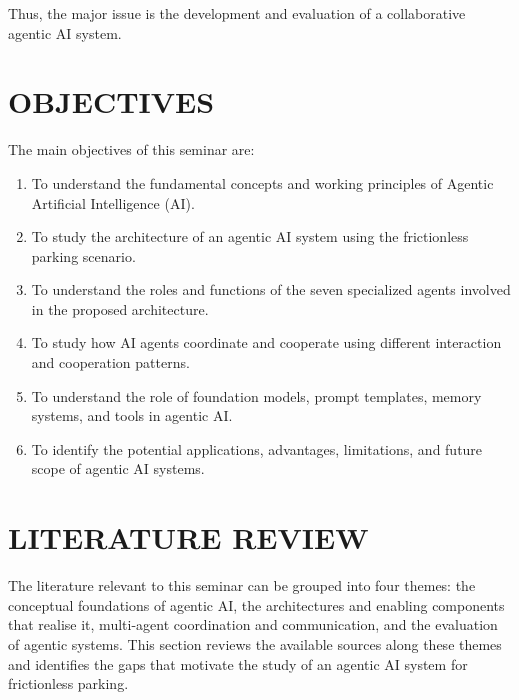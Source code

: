 \documentclass[12pt,a4paper]{report}
\begin{document}
Thus, the major issue is the development and evaluation of a collaborative agentic AI system.

\chapter{OBJECTIVES}
The main objectives of this seminar are:
\begin{enumerate}[leftmargin=*]
  \item To understand the fundamental concepts and working principles of Agentic Artificial Intelligence (AI).
  \item To study the architecture of an agentic AI system using the frictionless parking scenario.
  \item To understand the roles and functions of the seven specialized agents involved in the proposed architecture.
  \item To study how AI agents coordinate and cooperate using different interaction and cooperation patterns.
  \item To understand the role of foundation models, prompt templates, memory systems, and tools in agentic AI.
  \item To identify the potential applications, advantages, limitations, and future scope of agentic AI systems.
\end{enumerate}

\chapter{LITERATURE REVIEW}
The literature relevant to this seminar can be grouped into four themes: the conceptual foundations of agentic AI, the architectures and enabling components that realise it, multi-agent coordination and communication, and the evaluation of agentic systems. This section reviews the available sources along these themes and identifies the gaps that motivate the study of an agentic AI system for frictionless parking.
\end{document}
